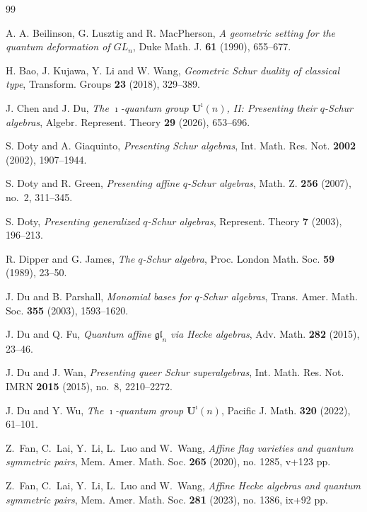 \documentclass[12pt]{amsart}
\numberwithin{equation}{section}
\theoremstyle{definition}
\theoremstyle{definition}
\begin{document}
\begin{thebibliography}{99}

A. A. Beilinson, G. Lusztig and R. MacPherson,
\emph{A geometric setting for the quantum deformation of $GL_n$},
Duke Math. J. {\bf 61} (1990), 655--677.

H. Bao, J. Kujawa, Y. Li and W. Wang,
\emph{Geometric Schur duality of classical type},
Transform. Groups {\bf 23} (2018), 329--389.

J. Chen and J. Du,
\emph{The $\imath$-quantum group $\mathbf U^{\imath}(n)$, II: Presenting their $q$-Schur algebras},
Algebr. Represent. Theory {\bf 29} (2026), 653--696.

S. Doty and A. Giaquinto,
\emph{Presenting Schur algebras},
Int. Math. Res. Not. {\bf 2002} (2002), 1907--1944.

S. Doty and R. Green, 
\emph{Presenting affine $q$-Schur algebras}, 
Math. Z. {\bf 256} (2007), no.~2, 311--345.

S. Doty,
\emph{Presenting generalized $q$-Schur algebras},
Represent. Theory {\bf 7} (2003), 196--213.

R. Dipper and G. James,
\emph{The $q$-Schur algebra},
Proc. London Math. Soc. {\bf 59} (1989), 23--50.


J. Du and B. Parshall,
\emph{Monomial bases for $q$-Schur algebras},
Trans. Amer. Math. Soc. {\bf 355} (2003), 1593--1620.

J. Du and Q. Fu,
\emph{Quantum affine $\mathfrak{gl}_n$ via Hecke algebras},
Adv. Math. {\bf 282} (2015), 23--46.

J. Du and J. Wan, 
\emph{Presenting queer Schur superalgebras}, 
Int. Math. Res. Not. IMRN {\bf 2015} (2015), no.~8, 2210--2272.

J. Du and Y. Wu,
\emph{The $\imath$-quantum group $\mathbf U^{\imath}(n)$},
Pacific J. Math. {\bf 320} (2022), 61--101.

Z.~Fan, C.~Lai, Y.~Li, L.~Luo and W.~Wang, \emph{Affine flag varieties and quantum symmetric pairs}, Mem. Amer. Math. Soc. {\bf 265} (2020), no. 1285, v+123 pp.

Z.~Fan, C.~Lai, Y.~Li, L.~Luo and W.~Wang, \emph{Affine Hecke algebras and quantum symmetric pairs}, Mem. Amer. Math. Soc. {\bf 281} (2023), no. 1386, ix+92 pp.


\end{thebibliography}
\end{document}
